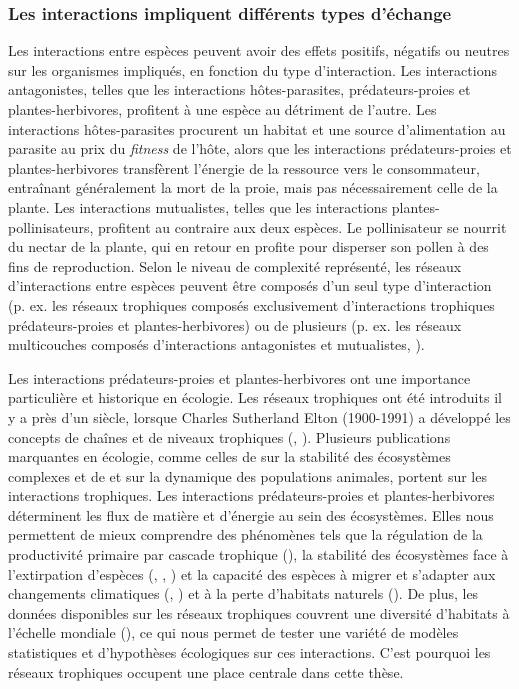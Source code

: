 \subsubsection{Les interactions impliquent différents types d'échange} 

Les interactions entre espèces peuvent avoir des effets positifs, négatifs ou
neutres sur les organismes impliqués, en fonction du type d'interaction. Les
interactions antagonistes, telles que les interactions hôtes-parasites,
prédateurs-proies et plantes-herbivores, profitent à une espèce au détriment de
l'autre. Les interactions hôtes-parasites procurent un habitat et une source
d'alimentation au parasite au prix du \textit{fitness} de l'hôte, alors que les
interactions prédateurs-proies et plantes-herbivores transfèrent l'énergie de la
ressource vers le consommateur, entraînant généralement la mort de la proie,
mais pas nécessairement celle de la plante. Les interactions mutualistes, telles
que les interactions plantes-pollinisateurs, profitent au contraire aux deux
espèces. Le pollinisateur se nourrit du nectar de la plante, qui en retour en
profite pour disperser son pollen à des fins de reproduction. Selon le niveau de
complexité représenté, les réseaux d'interactions entre espèces peuvent être
composés d'un seul type d'interaction (p. ex. les réseaux trophiques composés
exclusivement d'interactions trophiques prédateurs-proies et plantes-herbivores)
ou de plusieurs (p. ex. les réseaux multicouches composés d'interactions
antagonistes et mutualistes, \cite{Pilosof2017Multilayer}). 

Les interactions prédateurs-proies et plantes-herbivores ont une importance
particulière et historique en écologie. Les réseaux trophiques ont été
introduits il y a près d'un siècle, lorsque Charles Sutherland Elton (1900-1991)
a développé les concepts de chaînes et de niveaux trophiques
(\cite{Elton1927Animal}, \cite{Elton1958Ecology}). Plusieurs publications
marquantes en écologie, comme celles de \cite{May1972Will} sur la stabilité des
écosystèmes complexes et de \cite{Lotka1925Elements} et
\cite{Volterra1927Fluctuations} sur la dynamique des populations animales,
portent sur les interactions trophiques. Les interactions prédateurs-proies et
plantes-herbivores déterminent les flux de matière et d'énergie au sein des
écosystèmes. Elles nous permettent de mieux comprendre des phénomènes tels que
la régulation de la productivité primaire par cascade trophique
(\cite{Carpenter1987Regulation}), la stabilité des écosystèmes face à
l'extirpation d'espèces (\cite{Dunne2002Network}, \cite{Srinivasan2007Response},
\cite{Staniczenko2010Structural}) et la capacité des espèces à migrer et
s'adapter aux changements climatiques (\cite{Tylianakis2008Global},
\cite{Gilman2010Framework}) et à la perte d'habitats naturels
(\cite{Evans2013Robustness}). De plus, les données disponibles sur les réseaux
trophiques couvrent une diversité d'habitats à l'échelle mondiale
(\cite{Poisot2021Global}), ce qui nous permet de tester une variété de modèles
statistiques et d'hypothèses écologiques sur ces interactions. C'est pourquoi 
les réseaux trophiques occupent une place centrale dans cette thèse. 

